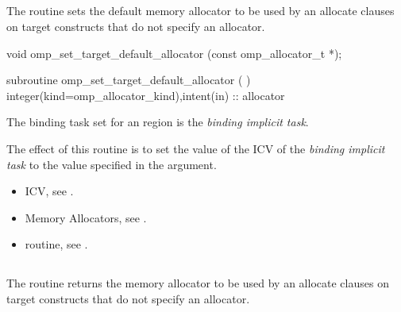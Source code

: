 \ccppspecificstart

\subsection{}
\label{subsec:omp_set_target_default_allocator}

\summary
The  routine sets the default memory allocator to be used by an allocate clauses on target constructs that do not specify an allocator.

\format
\ccppspecificstart
\begin{boxedcode}
void omp_set_target_default_allocator (const omp_allocator_t *);
\end{boxedcode}
\ccppspecificend
\fortranspecificstart
\begin{boxedcode}
subroutine omp_set_target_default_allocator (  )
integer(kind=omp_allocator_kind),intent(in) :: allocator
\end{boxedcode}
\fortranspecificend
\binding
The binding task set for an  region is the \emph{binding implicit task}.

\effect

The effect of this routine is to set the value of the  ICV of the \emph{binding implicit task} to the value specified in the  argument. 

\crossreferences

\begin{itemize}
\item {} ICV, see .
\item Memory Allocators, see .
\item {} routine, see .
\end{itemize}

\subsection{}
\label{subsec:omp_get_target_default_allocator}

\summary
The  routine returns the memory allocator to be used by an allocate clauses on target constructs that do not specify an allocator.

